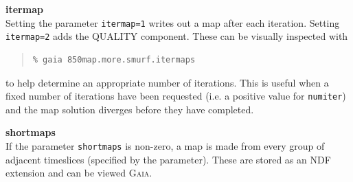 \documentclass[twoside,11pt]{article}
\newcommand{\xref}[3]{#1}
\renewcommand{\_}{\texttt{\symbol{95}}}
\newenvironment{myquote}{\begin{quote}\begin{small}}{\end{small}\end{quote}}
\newcommand{\gaia}{\xref{\textsc{Gaia}}{sun214}{}}
\begin{document}
{\bf itermap}\\
Setting the parameter \texttt{itermap=1} writes out a map after each
iteration. Setting \texttt{itermap=2} adds the QUALITY component.
These can be visually inspected with

\begin{myquote}
\begin{verbatim}
% gaia 850map.more.smurf.itermaps
\end{verbatim}
\end{myquote}
to help determine an appropriate number of iterations. This is useful
when a fixed number of iterations have been requested (i.e. a positive
value for \texttt{numiter}) and the map solution diverges before
they have completed.

\textbf{shortmaps}\\
If the parameter \texttt{shortmaps} is non-zero, a map is made from
every group of adjacent timeslices (specified by the parameter).
These are stored as an NDF extension and can be viewed \gaia.
\end{document}
